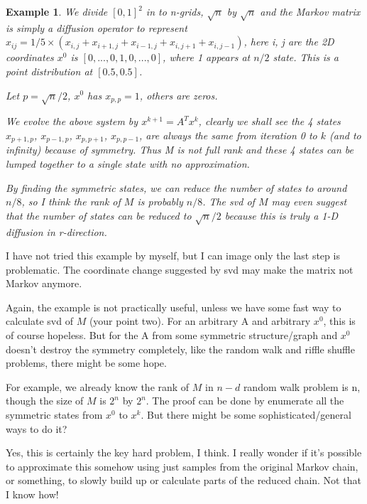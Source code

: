 \documentclass{article}
\newtheorem{example}{Example}
\begin{document}
\begin{example}

We divide $[0,1]^2$ in to n-grids, $\sqrt{n}$ by $\sqrt{n}$
and the Markov matrix is simply a diffusion operator to represent
$x_{ij} = 1/5 \times (x_{i,j}+x_{i+1,j}+x_{i-1,j}+x_{i,j+1}+x_{i,j-1})$, here
i, j are the 2D coordinates
$x^0$ is $[0,...,0,1,0,...,0]$, where 1 appears at $n/2$ state. This is a
point distribution at $[0.5,0.5]$.

Let $p=\sqrt{n}/2$, $x^0$ has $x_{p,p}=1$, others are zeros.

We evolve the above system by $x^{k+1} = A^T x^k$, clearly we shall see
the 4 states $x_{p+1,p}$, $x_{p-1,p}$, $x_{p,p+1}$, $x_{p,p-1}$,  are always
the same from iteration 0 to $k$ (and to infinity) because of symmetry.
Thus M is not full rank and these 4 states can be lumped together to a
single state with no approximation.

By finding the symmetric states, we can reduce the number of states to
around $n/8$, so I think the rank of $M$ is probably $n/8$. The svd of $M$ may
even suggest that the number of states can be reduced to $\sqrt{n}/2$
because this is truly a 1-D diffusion in r-direction.

\end{example}


 I have not tried this example by myself, but I can image only the last step is problematic. The coordinate
 change suggested by svd may make the matrix not Markov anymore.

Again, the example is not practically useful, unless we have some fast
 way to calculate svd of $M$ (your point two). For an arbitrary A and
 arbitrary $x^0$, this is of course hopeless. But for the A from some
 symmetric structure/graph and $x^0$ doesn't destroy the symmetry
 completely, like the random walk and riffle shuffle problems, there
 might be some hope.

 For example, we already know the rank of $M$ in $n-d$ random walk problem
 is n, though the size of $M$ is $2^n$ by $2^n$. The proof can be done by
 enumerate all the symmetric states from $x^0$ to $x^k$. But there might be
 some sophisticated/general ways to do it?

Yes, this is certainly the key hard problem, I think. I really wonder if it's possible to approximate this somehow using just samples from the original Markov chain, or something, to slowly build up or calculate parts of the reduced chain. Not that I know how!
\end{document}
